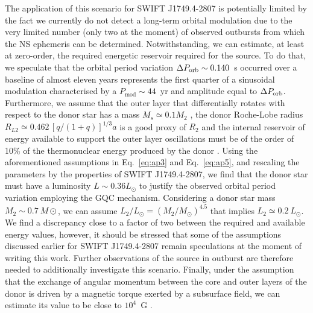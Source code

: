 \documentclass[fleqn,usenatbib]{mnras}
\newcommand{\swiftj}{SWIFT J1749.4-2807}
\begin{document}
The application of this scenario for \swiftj{} is potentially limited by the fact we currently do not detect a long-term orbital modulation due to the very limited number (only two at the moment) of observed outbursts from which the NS ephemeris can be determined. Notwithstanding, we can estimate, at least at zero-order, the required energetic reservoir required for the source. To do that, we speculate that the orbital period variation $\Delta P_{\rm orb}\sim0.140$~s occurred over a baseline of almost eleven years represents the first quarter of a sinusoidal modulation characterised by a $P_\text{mod}\sim 44$~yr and amplitude equal to $\Delta P_{\rm orb}$. Furthermore, we assume that the outer layer that differentially rotates with respect to the donor star has a mass $M_s\simeq 0.1 M_2$ \citep{Applegate:1994vp}, the donor  Roche-Lobe radius $R_{L2}\simeq 0.462\, [q/(1+q)]^{1/3} a$ \citep[valid for mass ratio $q\leq0.8$;][]{Paczynski71} is a good proxy of $R_2$	and the internal reservoir of energy available to support the outer layer oscillations must be of the order of 10\% of the thermonuclear energy produced by the donor \citep{Applegate:1992uh}. Using the aforementioned assumptions in Eq.~\ref{eq:ap3} and Eq.~\ref{eq:ap5}, and rescaling the parameters by the properties of \swiftj{}, we find that the donor star must have a luminosity $L\sim0.36L_\odot$ to justify the observed orbital period variation employing the GQC mechanism. Considering a donor star mass $M_2\sim0.7~M\odot$, we can assume $L_2/L_\odot=(M_2/M_\odot)^{4.5}$ that implies $L_2\simeq0.2~L_\odot$. We find a discrepancy close to a factor of two between the required and available energy values, however, it should be stressed that some of the assumptions discussed earlier for \swiftj{} remain speculations at the moment of writing this work. Further observations of the source in outburst are therefore needed to additionally investigate this scenario.
Finally, under the assumption that the exchange of angular momentum between the core and outer layers of the donor is driven by a magnetic torque exerted by a subsurface field, we can estimate its value to be close to $10^4$~G \citep[see][equation 23]{Applegate:1992uh}.
\end{document}
